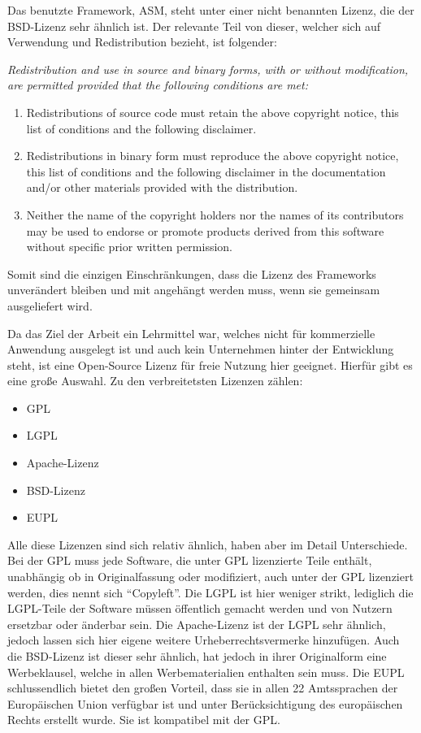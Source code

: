 Das benutzte Framework, ASM, steht unter einer nicht benannten Lizenz, die der BSD-Lizenz sehr ähnlich ist. Der relevante Teil von dieser, welcher sich auf Verwendung und Redistribution bezieht, ist folgender:

{\itshape
Redistribution and use in source and binary forms, with or without
modification, are permitted provided that the following conditions
are met:

\begin{enumerate}
	\item Redistributions of source code must retain the above copyright notice, this list of conditions and the following disclaimer.
	\item Redistributions in binary form must reproduce the above copyright notice, this list of conditions and the following disclaimer in the documentation and/or other materials provided with the distribution.
	\item Neither the name of the copyright holders nor the names of its contributors may be used to endorse or promote products derived from this software without specific prior written permission.
\end{enumerate}
}
\cite{asm_license}

Somit sind die einzigen Einschränkungen, dass die Lizenz des Frameworks unverändert bleiben und mit angehängt werden muss, wenn sie gemeinsam ausgeliefert wird.

Da das Ziel der Arbeit ein Lehrmittel war, welches nicht für kommerzielle Anwendung ausgelegt ist und auch kein Unternehmen hinter der Entwicklung steht, ist eine Open-Source Lizenz für freie Nutzung hier geeignet. Hierfür gibt es eine große Auswahl. Zu den verbreitetsten Lizenzen zählen:

\begin{itemize}
	\item \ac{GPL}
	\item \ac{LGPL}
	\item Apache-Lizenz
	\item \ac{BSD}-Lizenz
	\item \ac{EUPL}
\end{itemize}

Alle diese Lizenzen sind sich relativ ähnlich, haben aber im Detail Unterschiede.
Bei der \ac{GPL} muss jede Software, die unter GPL lizenzierte Teile enthält, unabhängig ob in Originalfassung oder modifiziert, auch unter der \ac{GPL} lizenziert werden, dies nennt sich "`Copyleft"'. \cite{gpl_wiki}
Die \ac{LGPL} ist hier weniger strikt, lediglich die \ac{LGPL}-Teile der Software müssen öffentlich gemacht werden und von Nutzern ersetzbar oder änderbar sein. \cite{lgpl_wiki}
Die Apache-Lizenz ist der \ac{LGPL} sehr ähnlich, jedoch lassen sich hier eigene weitere Urheberrechtsvermerke hinzufügen. \cite{apache_wiki}
Auch die \ac{BSD}-Lizenz ist dieser sehr ähnlich, hat jedoch in ihrer Originalform eine Werbeklausel, welche in allen Werbematerialien enthalten sein muss. \cite{bsd_wiki}
Die \ac{EUPL} schlussendlich bietet den großen Vorteil, dass sie in allen 22 Amtssprachen der Europäischen Union verfügbar ist und unter Berücksichtigung des europäischen Rechts erstellt wurde. Sie ist kompatibel mit der \ac{GPL}. \cite{eupl_wiki}

